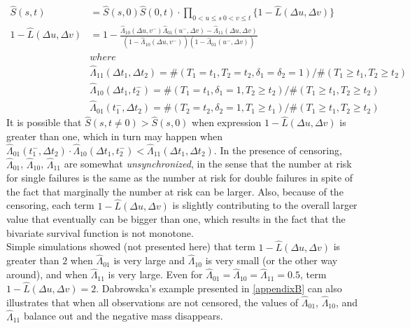 \documentclass[]{article}
\begin{document}
	$$
	\begin{aligned}
		\hat{S}(s,t) &= \hat{S}(s,0)\hat{S}(0,t)\cdot \prod_{{0<u\leq s~0<v\leq t}}\{1 - \hat{L}(\Delta u, \Delta v)\}\\
    1 - \hat{L}(\Delta u, \Delta v) &= 1 - \frac{\hat{\Lambda}_{10}(\Delta u,v^-)\hat{\Lambda}_{01}(u^-,\Delta v) - \hat{\Lambda}_{11}(\Delta u,\Delta v)}{\left(1-\hat{\Lambda}_{10}(\Delta u,v^-)\right)\left(1-\hat{\Lambda}_{01}(u^-,\Delta v)\right)}\\
  &where\\
	&\hat{\Lambda}_{11}(\Delta t_1, \Delta t_2) = \#(T_1=t_1, T_2=t_2, \delta_1=\delta_2=1)/\#(T_1\geq t_1, T_2\geq t_2)\\
	&\hat{\Lambda}_{10}(\Delta t_1, t_2^-) = \#(T_1=t_1, \delta_1=1, T_2\geq t_2)/\#(T_1\geq t_1, T_2\geq t_2)\\
	&\hat{\Lambda}_{01}(t_1^-,\Delta  t_2) = \#(T_2=t_2, \delta_2=1, T_1\geq t_1)/\#(T_1\geq t_1, T_2\geq t_2)
	\end{aligned}
	$$
It is possible that $\hat{S}(s,t\neq 0) > \hat{S}(s,0)$ when expression $1 - \hat{L}(\Delta u, \Delta v)$ is greater than one, which in turn may happen when  $\hat{\Lambda}_{01}(t_1^-,\Delta  t_2) \cdot \hat{\Lambda}_{10}(\Delta t_1, t_2^-)< \hat{\Lambda}_{11}(\Delta t_1, \Delta t_2)$. In the presence of censoring, $\hat{\Lambda}_{01}$, $\hat{\Lambda}_{10}$, $\hat{\Lambda}_{11}$ are somewhat \emph{unsynchronized}, in the sense that the number at risk for single failures is the same as the number at risk for double failures in spite of the fact that marginally the number at risk can be larger. Also, because of the censoring, each term $1 - \hat{L}(\Delta u, \Delta v)$ is slightly contributing to the overall larger value that eventually can be bigger than one, which results in the fact that the bivariate survival function is not monotone.\\
Simple simulations showed (not presented here) that term $1 - \hat{L}(\Delta u, \Delta v)$ is greater than $2$ when $\hat{\Lambda}_{01}$ is very large and $\hat{\Lambda}_{10}$ is very small (or the other way around), and when $\hat{\Lambda}_{11}$ is very large. Even for $\hat{\Lambda}_{01} = \hat{\Lambda}_{10} = \hat{\Lambda}_{11} = 0.5$, term $1 - \hat{L}(\Delta u, \Delta v) = 2$.  Dabrowska's example presented in \ref{appendixB} can also illustrates that when all observations are not censored, the values of $\hat{\Lambda}_{01}$, $\hat{\Lambda}_{10}$, and $\hat{\Lambda}_{11}$ balance out and the negative mass disappears.\\
\end{document}
